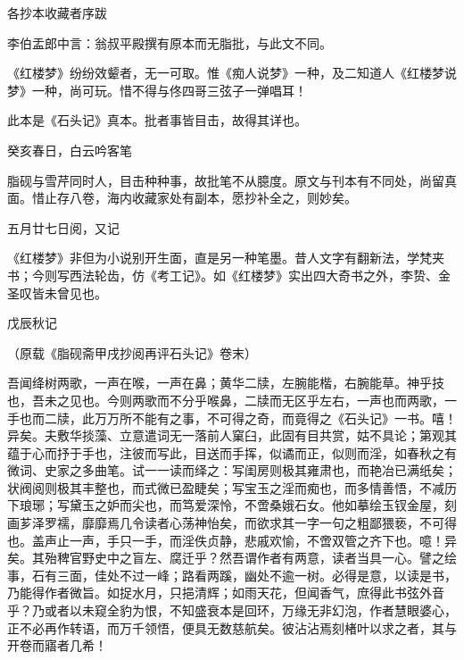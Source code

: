 \newpage

\begin{center}
	{\Huge \heiti 各抄本收藏者序跋}
\end{center}




{}

李伯盂郎中言：翁叔平殿撰有原本而无脂批，与此文不同。

《红楼梦》纷纷效颦者，无一可取。惟《痴人说梦》一种，及二知道人《红楼梦说梦》一种，尚可玩。惜不得与佟四哥三弦子一弹唱耳！

此本是《石头记》真本。批者事皆目击，故得其详也。

\begin{flushright}
	癸亥春日，白云吟客笔　　
\end{flushright}

脂砚与雪芹同时人，目击种种事，故批笔不从臆度。原文与刊本有不同处，尚留真面。惜止存八卷，海内收藏家处有副本，愿抄补全之，则妙矣。

\begin{flushright}
	五月廿七日阅，又记　　
\end{flushright}

《红楼梦》非但为小说别开生面，直是另一种笔墨。昔人文字有翻新法，学梵夹书；今则写西法轮齿，仿《考工记》。如《红楼梦》实出四大奇书之外，李贽、金圣叹皆未曾见也。

\begin{flushright}
	戊辰秋记　　

{（原载《脂砚斋甲戌抄阅再评石头记》卷末）}　　

\end{flushright}
{}

吾闻绛树两歌，一声在喉，一声在鼻；黄华二牍，左腕能楷，右腕能草。神乎技也，吾未之见也。今则两歌而不分乎喉鼻，二牍而无区乎左右，一声也而两歌，一手也而二牍，此万万所不能有之事，不可得之奇，而竟得之《石头记》一书。嘻！异矣。夫敷华掞藻、立意遣词无一落前人窠臼，此固有目共赏，姑不具论；第观其蕴于心而抒于手也，注彼而写此，目送而手挥，似谲而正，似则而淫，如春秋之有微词、史家之多曲笔。试一一读而绎之：写闺房则极其雍肃也，而艳冶已满纸矣；状阀阅则极其丰整也，而式微已盈睫矣；写宝玉之淫而痴也，而多情善悟，不减历下琅琊；写黛玉之妒而尖也，而笃爱深怜，不啻桑娥石女。他如摹绘玉钗金屋，刻画芗泽罗襦，靡靡焉几令读者心荡神怡矣，而欲求其一字一句之粗鄙猥亵，不可得也。盖声止一声，手只一手，而淫佚贞静，悲戚欢愉，不啻双管之齐下也。噫！异矣。其殆稗官野史中之盲左、腐迁乎？然吾谓作者有两意，读者当具一心。譬之绘事，石有三面，佳处不过一峰；路看两蹊，幽处不逾一树。必得是意，以读是书，乃能得作者微旨。如捉水月，只挹清辉；如雨天花，但闻香气，庶得此书弦外音乎？乃或者以未窥全豹为恨，不知盛衰本是回环，万缘无非幻泡，作者慧眼婆心，正不必再作转语，而万千领悟，便具无数慈航矣。彼沾沾焉刻楮叶以求之者，其与开卷而寤者几希！

